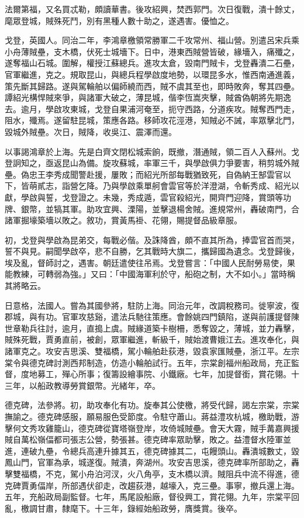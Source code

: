\begin{pinyinscope}
法爾第福，又名買忒勒，頗讀華書。後攻紹興，焚西郭門。次日復戰，潰十餘丈，麾眾登城，賊殊死鬥，別有黑種人數十助之，遂遇害。優恤之。

戈登，英國人。同治二年，李鴻章檄領常勝軍二千攻常州、福山營。別遣呂宋兵乘小舟薄賊壘，支木橋，伏死士城墻下。日中，港東西賊營皆破，緣墻入，痛殲之，遂奪福山石城。圍解，權授江蘇總兵。進攻太倉，毀南門賊卡，戈登轟潰二石壘，官軍繼進，克之。規取昆山，與總兵程學啟度地勢，以環昆多水，惟西南通進義，策先斷其歸路。遂與駕輪舶以偏師繞而西，賊不虞其至也，即時敗奔，奪其四壘。譚紹光構悍賊來爭，與諸軍大破之，薄昆城，偕李恆嵩夾擊，賊酋偽朝將先期逸去。逾月，學啟攻東城，戈登自果浦河奄至，扼守西路，分道疾攻。賊奪西門走，阻水，殲焉。遂留駐昆城，策應各路。移師攻花涇港，知賊必不誡，率眾擊北門，毀城外賊壘。次日，賊降，收吳江、震澤而還。

以事謁鴻章於上海。先是白齊文閉松城索餉，既撤，潛通賊，領二百人入蘇州。戈登詗知之，亟返昆山為備。旋攻蘇城，率軍三千，與學啟俱力爭要害，稍剪城外賊壘。偽忠王李秀成聞警赴援，屢敗；而紹光所部每戰猶致死，自偽納王郜雲官以下，皆萌貳志，詣營乞降。乃與學啟乘單舸會雲官等於洋澄湖，令斬秀成、紹光以獻，學啟與誓，戈登證之。未幾，秀成遁，雲官殺紹光，開齊門迎降，賞頭等功牌、銀幣，並犒其軍。助攻宜興、溧陽，並擊退楊舍賊。進規常州，轟破南門，合諸軍掘壕築墻以敗之。敘功，賞黃馬褂、花翎，賜提督品級章服。

初，戈登與學啟為昆弟交，每戰必偕。及誅降酋，頗不直其所為，捧雲官首而哭，誓不與見。嗣聞學啟卒，悲不自勝，乞其戰時大旗二，攜歸國為遺念。戈登歸後，埃及亂，督師討之，遇害。朝廷遣使往吊焉。戈登嘗言：「中國人民耐勞易使，果能教練，可轉弱為強。」又曰：「中國海軍利於守，船砲之制，大不如小。」當時稱其將略云。

日意格，法國人。嘗為其國參將，駐防上海。同治元年，改調稅務司。徙寧波，復郡城，與有功。官軍攻慈谿，遣法兵馳往策應。會餘姚四門鎮陷，遂與前護提督陳世章勒兵往討，逾月，直搗上虞。賊緣道築卡樹柵，悉奪毀之，薄城，並力轟擊，賊殊死戰，賈勇直前，被創，眾軍繼進，斬級千，賊始渡曹娥江去。進攻奉化，與諸軍克之。攻安吉思溪、雙福橋，駕小輪舶赴荻港，毀袁家匯賊壘，浙江平。左宗棠令與德克碑討測西邦制造，仿造小輪舶試行。五年，宗棠創福州船政局，充正監督，度地募工，殫心所事；復籌設繪事院、小鐵廠。七年，加提督銜，賞花翎。十三年，以船政教導勞賞銀幣。光緒年，卒。

德克碑，法參將。初，助攻奉化有功。旋奉其公使檄，將受代歸，謁左宗棠，宗棠撫諭之。德克碑感服，願易服色受節度。令駐守蕭山。蔣益澧攻杭城，檄助戰，游擊何文秀攻雞籠山，德克碑從寶塔嶺登岸，攻倚城賊壘。會天大霧，賊手冓嘉興援賊自萬松嶺偪都司張志公營，勢張甚。德克碑率眾助擊，敗之。益澧督水陸軍並進，連破九壘，令總兵高連升據其五，德克碑據其二，屯饅頭山。轟潰城數丈，毀鳳山門，官軍為承，城遂復。賊潰，奔湖州。攻安吉思溪，德克碑率所部助之，轟擊雙福橋，不克，駕小舟泊河汊，火八角亭，支木橋以濟。賊阻兵中流不得進，德克碑賈勇偪岸，所部遇伏卻走，改趨荻港，越壕入，克三壘。事寧，撤兵還上海。五年，充船政局副監督。七年，馬尾設船廠，督役興工，賞花翎。九年，宗棠平回亂，檄調甘肅，隸麾下。十三年，錄經始船政勞，膺獎賞。後卒。


\end{pinyinscope}
